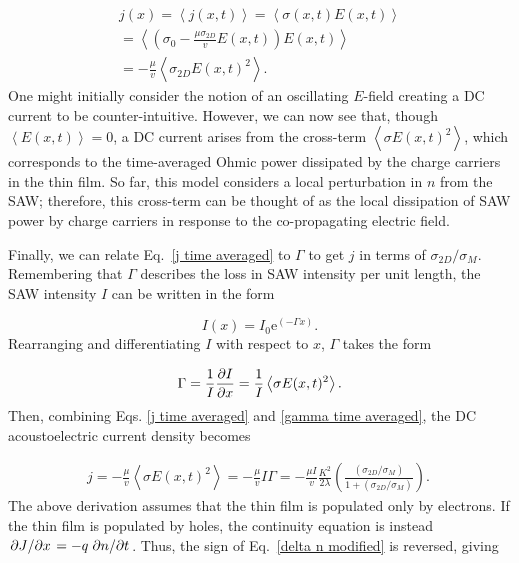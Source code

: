 \documentclass[double,12pt,1in,seploa]{beavtex}
\begin{document}
\begin{equation}
    \begin{split}
        j(x) = \left\langle j(x,t) \right\rangle = \left\langle \sigma(x,t) E(x,t) \right\rangle \\
        = \left\langle \left( \sigma_0 - \frac{\mu \sigma_{2D}}{v}E(x,t) \right) E(x,t)  \right\rangle \\
        = - \frac{\mu}{v}\left\langle\sigma_{2D} E(x,t)^2\right\rangle. 
    \end{split}
    \label{j time averaged}
\end{equation}
One might initially consider the notion of an oscillating $E$-field creating a DC current to be counter-intuitive. However, we can now see that, though $\left\langle E(x,t) \right\rangle = 0$, a DC current arises from the cross-term $\left\langle \sigma E(x,t) ^2 \right\rangle$, which corresponds to the time-averaged Ohmic power dissipated by the charge carriers in the thin film. So far, this model considers a local perturbation in $n$ from the SAW; therefore, this cross-term can be thought of as the local dissipation of SAW power by charge carriers in response to the co-propagating electric field. 

Finally, we can relate Eq.\ \ref{j time averaged} to $\Gamma$ to get $j$ in terms of $\sigma_{2D}/\sigma_M$. Remembering that $\Gamma$ describes the loss in SAW intensity per unit length, the SAW intensity $I$ can be written in the form

\begin{equation}
    I(x) = I_0 \mathrm{e}^{(-\Gamma x)}.
\end{equation}
Rearranging and differentiating $I$ with respect to $x$, $\Gamma$ takes the form

\begin{equation}
    \Gamma = \frac{1}{I} \pdv{I}{x} = \frac{1}{I}\left\langle\sigma E(x,t)^2\right\rangle. \label{gamma time averaged}
\end{equation}
Then, combining Eqs. \ref{j time averaged} and \ref{gamma time averaged}, the DC acoustoelectric current density becomes

\begin{equation}
    \begin{split}
        j = - \frac{\mu}{v}\left\langle\sigma E(x,t)^2\right\rangle = - \frac{\mu}{v} I\Gamma = - \frac{\mu I}{v} \frac{K^2}{2\lambda}(\frac{(\sigma_{2D}/\sigma_M)}{1+(\sigma_{2D}/\sigma_M)}). \
    \end{split}
    \label{DC AEC electron case}
\end{equation}
The above derivation assumes that the thin film is populated only by electrons. If the thin film is populated by holes, the continuity equation is instead $\pdv*{J}{x} = -q \pdv*{n}{t}$. Thus, the sign of Eq.\ \ref{delta n modified} is reversed, giving
\end{document}
